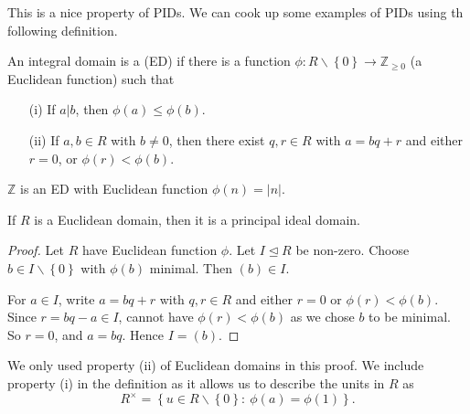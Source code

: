 \documentclass[egregdoesnotlikesansseriftitles,a4paper]{scrartcl}
\begin{document}
This is a nice property of PIDs. We can cook up some examples of PIDs using th following definition. 
\begin{definition*}
      An integral domain is a  (ED) if there is a function $\phi: R\backslash \left\{0\right\} \rightarrow \mathbb{Z}_{\geq 0}$ (a Euclidean function) such that 
      \begin{itemize}
            \item[(i)] If $a|b$, then $\phi (a)\leq \phi (b)$.
            \item[(ii)] If $a,b \in R$ with $b \neq 0$, then there exist $q,r \in R$ with $a=bq+r$ and either $r=0$, or $\phi (r)<\phi (b)$.
      \end{itemize}
\end{definition*}
\begin{example*}
       $\mathbb{Z}$ is an ED with Euclidean function $\phi (n)=\left|n\right|$.
\end{example*}
\begin{proposition}\label{edimppid}
       If $R$ is a Euclidean domain, then it is a principal ideal domain.
\end{proposition}
\begin{proof}
      Let $R$ have Euclidean function $\phi$. Let $I \unlhd R$ be non-zero. Choose $b \in I\backslash \left\{0\right\}$ with $\phi (b)$ minimal. Then $(b)\in I$. 
      
      For $a \in I$, write $a=bq+r $ with $q,r \in R$ and either $r=0$ or $\phi (r)< \phi (b)$. Since $r=bq-a \in I$, cannot have $\phi (r)< \phi (b)$ as we chose $b$ to be minimal. So $r=0$, and $a=bq$. Hence $I= (b)$.
\end{proof}
\begin{remark}
      We only used property (ii) of Euclidean domains in this proof. We include property (i) in the definition as it allows us to describe the units in $R$ as \[
      R^{\times }=\left\{u \in R\backslash \left\{0\right\}: \ \phi (a)=\phi (1)\right\}
      .\]
\end{remark}
\end{document}
